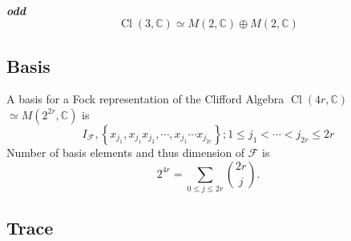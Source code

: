 \documentclass[aps,preprint]{revtex4}%
\begin{document}
\subparagraph{odd%
\begin{equation}
\operatorname*{Cl}\left(  3,\mathbb{C}\right)  \simeq M\left(  2,\mathbb{C}%
\right)  \oplus M\left(  2,\mathbb{C}\right)
\end{equation}
}

\subsection{Basis}

A basis for a Fock representation of the Clifford Algebra $\operatorname*{Cl}%
\left(  4r,\mathbb{C}\right)  $ $\simeq M\left(  2^{2r},\mathbb{C}\right)  $
is
\begin{equation}
I_{\mathcal{F}},\left\{  x_{j_{1}},x_{j_{1}}x_{j_{2}},\cdots,x_{j_{1}}\cdots
x_{j_{2r}}\right\}  ;1\leq j_{1}<\cdots<j_{2r}\leq2r
\end{equation}
Number of basis elements and thus dimension of $\mathcal{F}$ is
\begin{equation}
2^{4r}=\sum_{0\leq j\leq2r}\binom{2r}{j}.
\end{equation}


\subsection{Trace}
\end{document}
